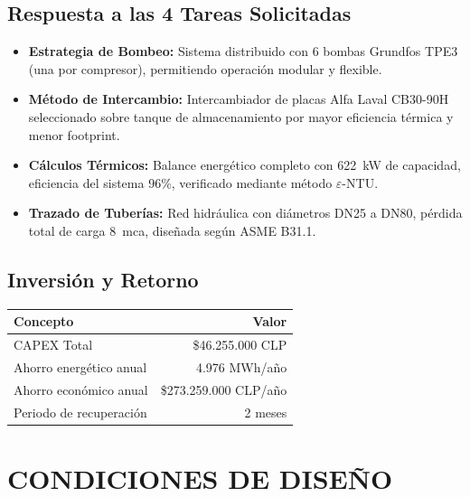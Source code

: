 \documentclass[12pt,a4paper]{article}
\begin{document}
\subsection*{Respuesta a las 4 Tareas Solicitadas}

\begin{itemize}[leftmargin=1.5cm]
    \item[\textbf{Tarea 1}] \textbf{Estrategia de Bombeo:} Sistema distribuido con 6 bombas Grundfos TPE3 (una por compresor), permitiendo operación modular y flexible.
    
    \item[\textbf{Tarea 2}] \textbf{Método de Intercambio:} Intercambiador de placas Alfa Laval CB30-90H seleccionado sobre tanque de almacenamiento por mayor eficiencia térmica y menor footprint.
    
    \item[\textbf{Tarea 3}] \textbf{Cálculos Térmicos:} Balance energético completo con 622~kW de capacidad, eficiencia del sistema 96\%, verificado mediante método $\varepsilon$-NTU.
    
    \item[\textbf{Tarea 4}] \textbf{Trazado de Tuberías:} Red hidráulica con diámetros DN25 a DN80, pérdida total de carga 8~mca, diseñada según ASME B31.1.
\end{itemize}

\subsection*{Inversión y Retorno}

\begin{table}[h]
\centering
\begin{tabular}{lr}
\toprule
\textbf{Concepto} & \textbf{Valor} \\
\midrule
CAPEX Total & \$46.255.000 CLP \\
Ahorro energético anual & 4.976 MWh/año \\
Ahorro económico anual & \$273.259.000 CLP/año \\
Periodo de recuperación & 2 meses \\
\bottomrule
\end{tabular}
\end{table}

\newpage

\section{CONDICIONES DE DISEÑO}
\end{document}
